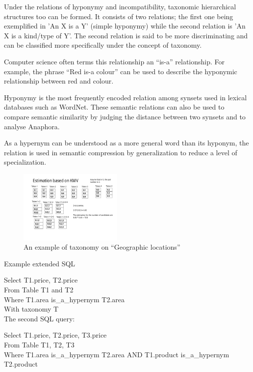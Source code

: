 \documentclass{sig-alternate}
\begin{document}
Under the relations of hyponymy and incompatibility, taxonomic hierarchical structures too can be formed. It consists of two relations; the first one being exemplified in 'An X is a Y' (simple hyponymy) while the second relation is 'An X is a kind/type of Y'. The second relation is said to be more discriminating and can be classified more specifically under the concept of taxonomy.

Computer science often terms this relationship an ``is-a'' relationship. For example, the phrase ``Red is-a colour'' can be used to describe the hyponymic relationship between red and colour.

Hyponymy is the most frequently encoded relation among synsets used in lexical databases such as WordNet. These semantic relations can also be used to compare semantic similarity by judging the distance between two synsets and to analyse Anaphora.

As a hypernym can be understood as a more general word than its hyponym, the relation is used in semantic compression by generalization to reduce a level of specialization.

\begin{figure}[t]
\centering
\includegraphics[width=0.45\textwidth]{figures/taxonomy}
 \caption{An example of taxonomy on ``\textsf{Geographic locations}''}
\label{fig:taxonomy}
\end{figure}

Example extended SQL

Select  T1.price, T2.price \\
From Table T1 and T2 \\
Where T1.area is\_a\_hypernym T2.area \\
With taxonomy T \\


The second SQL query:

Select  T1.price, T2.price, T3.price \\
From Table T1, T2, T3 \\
Where T1.area is\_a\_hypernym T2.area AND T1.product is\_a\_hypernym T2.product
\end{document}

